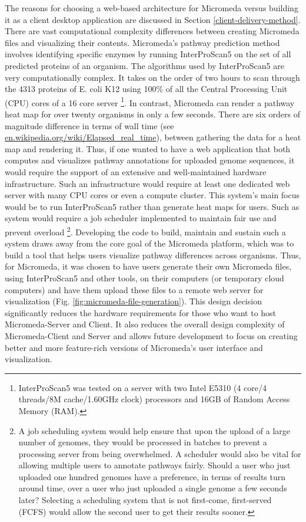 The reasons for choosing a web-based architecture for Micromeda versus building it as a client desktop application are discussed in Section \ref{client-delivery-method}. There are vast computational complexity differences between creating Micromeda files and visualizing their contents. Micromeda's pathway prediction method involves identifying specific enzymes by running InterProScan5 on the set of all predicted proteins of an organism. The algorithms used by InterProScan5 are very computationally complex. It takes on the order of two hours to scan through the 4313 proteins of E. coli K12 using 100\% of all the Central Processing Unit (CPU) cores of a 16 core server \footnote{InterProScan5 was tested on a server with two Intel E5310 (4 core/4 threads/8M cache/1.60GHz clock) processors and 16GB of Random Access Memory (RAM).}. In contrast, Micromeda can render a pathway heat map for over twenty organisms in only a few seconds. There are six orders of magnitude difference in terms of wall time (see \href{en.wikipedia.org/wiki/Elapsed\_real\_time}{en.wikipedia.org/wiki/Elapsed\_real\_time}), between gathering the data for a heat map and rendering it. Thus, if one wanted to have a web application that both computes and visualizes pathway annotations for uploaded genome sequences, it would require the support of an extensive and well-maintained hardware infrastructure. Such an infrastructure would require at least one dedicated web server with many CPU cores or even a compute cluster. This system's main focus would be to run InterProScan5 rather than generate heat maps for users. Such as system would require a job scheduler implemented to maintain fair use and prevent overload \footnote{A job scheduling system would help ensure that upon the upload of a large number of genomes, they would be processed in batches to prevent a processing server from being overwhelmed. A scheduler would also be vital for allowing multiple users to annotate pathways fairly. Should a user who just uploaded one hundred genomes have a preference, in terms of results turn around time, over a user who just uploaded a single genome a few seconds later? Selecting a scheduling system that is not first-come, first-served (FCFS) would allow the second user to get their results sooner.}. Developing the code to build, maintain and sustain such a system draws away from the core goal of the Micromeda platform, which was to build a tool that helps users visualize pathway differences across organisms. Thus, for Micromeda, it was chosen to have users generate their own Micromeda files, using InterProScan5 and other tools, on their computers (or temporary cloud computers) and have them upload these files to a remote web server for visualization (Fig. \ref{fig:micromeda-file-generation}). This design decision significantly reduces the hardware requirements for those who want to host Micromeda-Server and Client. It also reduces the overall design complexity of Micromeda-Client and Server and allows future development to focus on creating better and more feature-rich versions of Micromeda's user interface and visualization.



